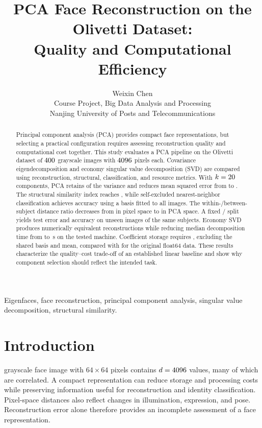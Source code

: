 \documentclass[journal]{IEEEtran}
\begin{document}
\title{PCA Face Reconstruction on the Olivetti Dataset:\\
Quality and Computational Efficiency}

\author{Weixin Chen\\
\small Course Project, Big Data Analysis and Processing\\
\small Nanjing University of Posts and Telecommunications}

\maketitle

\begin{abstract}
Principal component analysis (PCA) provides compact face representations,
but selecting a practical configuration requires assessing reconstruction
quality and computational cost together. This study evaluates a PCA pipeline
on the Olivetti dataset of $400$ grayscale images with $4096$ pixels each.
Covariance eigendecomposition and economy singular value decomposition
(SVD) are compared using reconstruction, structural, classification, and
resource metrics. With $k=20$ components, PCA retains \nVarKsSum{} of the
variance and reduces mean squared error from \nMSEBase{} to \nMSEK{}.
The structural similarity index reaches \nSsimK{}, while self-excluded
nearest-neighbor classification achieves \nAccK{} accuracy using a basis
fitted to all images. The within-/between-subject distance ratio decreases
from \nSepPix{} in pixel space to \nSepPCA{} in PCA space. A fixed
\nTrainN/\nTestN{} split yields test error \nTestMSE{} and accuracy
\nTestAcc{} on unseen images of the same subjects. Economy SVD produces
numerically equivalent reconstructions while reducing median decomposition
time from \nEighMed{} to \nSvdMed{}\,s on the tested machine. Coefficient
storage requires \nStorageKB{}, excluding the shared basis and mean,
compared with \nStorageOrig{} for the original float64 data. These results
characterize the quality--cost trade-off of an established linear baseline
and show why component selection should reflect the intended task.
\end{abstract}

\begin{IEEEkeywords}
Eigenfaces, face reconstruction, principal component analysis, singular value decomposition,
structural similarity.
\end{IEEEkeywords}

\section{Introduction}
 grayscale face image with $64\times64$ pixels contains
$d=4096$ values, many of which are correlated. A compact representation
can reduce storage and processing costs while preserving information useful
for reconstruction and identity classification. Pixel-space distances also
reflect changes in illumination, expression, and pose. Reconstruction error
alone therefore provides an incomplete assessment of a face representation.
\end{document}
